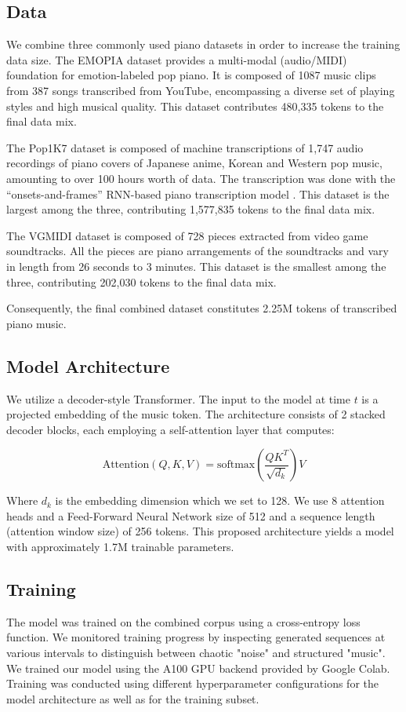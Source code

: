 \documentclass{article}
\begin{document}
\subsection{Data}
We combine three commonly used piano datasets in order to increase the training data size.
The EMOPIA dataset \cite{emopia} provides a multi-modal (audio/MIDI) foundation for emotion-labeled 
pop piano. It is composed of 1087 music clips from 387 songs transcribed from YouTube, encompassing a 
diverse set of playing styles and high musical quality. This dataset contributes 480,335 tokens 
to the final data mix.

The Pop1K7 dataset \cite{compoundword} is composed of machine transcriptions of 1,747 audio recordings of 
piano covers of Japanese anime, Korean and Western pop music, amounting to over 100 hours worth of data. The
transcription was done with the “onsets-and-frames” RNN-based piano transcription model
\cite{Hawthorne2017}. This dataset is the largest among the three, contributing 1,577,835 
tokens to the final data mix.

The VGMIDI dataset \cite{vgmidi} is composed of 728 pieces extracted from video game soundtracks. 
All the pieces are piano arrangements of the soundtracks and vary in length from 26 seconds 
to 3 minutes. This dataset is the smallest among the three, contributing 202,030 tokens to 
the final data mix.

Consequently, the final combined dataset constitutes 2.25M tokens of transcribed piano music.

\subsection{Model Architecture}\label{subsec:model}
We utilize a decoder-style Transformer. The input to the model at time $t$ is a projected embedding of 
the music token. The architecture consists of 2 stacked decoder blocks, each employing a self-attention 
layer that computes: 

$$\text{Attention}(Q, K, V) = \text{softmax}\left(\frac{QK^T}{\sqrt{d_k}}\right)V$$

Where $d_k$ is the embedding dimension which we set to 128. We use 8 attention heads and a Feed-Forward Neural
Network size of 512 and a sequence length (attention window size) of 256 tokens. This proposed architecture 
yields a model with approximately 1.7M trainable parameters.

\subsection{Training}\label{subsec:training}
The model was trained on the combined corpus using a cross-entropy loss function. We monitored 
training progress by inspecting generated sequences at various intervals to distinguish between 
chaotic "noise" and structured "music". We trained our model using the A100 GPU backend provided by 
Google Colab. Training was conducted using different hyperparameter configurations for the model
architecture as well as for the training subset.
\end{document}
